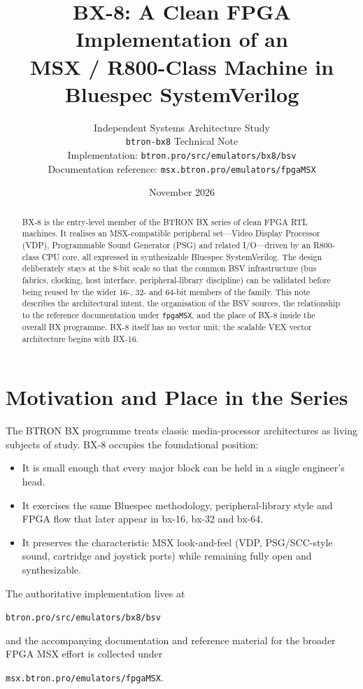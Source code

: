\documentclass[11pt,a4paper]{article}
\title{\textbf{BX-8: A Clean FPGA Implementation of an\\
MSX / R800-Class Machine in Bluespec SystemVerilog}}
\author{
  Independent Systems Architecture Study\\
  \texttt{btron-bx8} Technical Note\\[0.6em]
  \small Implementation: \texttt{btron.pro/src/emulators/bx8/bsv}\\
  \small Documentation reference: \texttt{msx.btron.pro/emulators/fpgaMSX}
}
\date{November 2026}
\begin{document}
\maketitle

\begin{abstract}
BX-8 is the entry-level member of the BTRON BX series of clean FPGA RTL machines. It realises an MSX-compatible peripheral set---Video Display Processor (VDP), Programmable Sound Generator (PSG) and related I/O---driven by an R800-class CPU core, all expressed in synthesizable Bluespec SystemVerilog. The design deliberately stays at the 8-bit scale so that the common BSV infrastructure (bus fabrics, clocking, host interface, peripheral-library discipline) can be validated before being reused by the wider 16-, 32- and 64-bit members of the family. This note describes the architectural intent, the organisation of the BSV sources, the relationship to the reference documentation under \texttt{fpgaMSX}, and the place of BX-8 inside the overall BX programme. BX-8 itself has no vector unit; the scalable VEX vector architecture begins with BX-16.
\end{abstract}

\section{Motivation and Place in the Series}

The BTRON BX programme treats classic media-processor architectures as living subjects of study. BX-8 occupies the foundational position:

\begin{itemize}[leftmargin=1.5em]
  \item It is small enough that every major block can be held in a single engineer's head.
  \item It exercises the same Bluespec methodology, peripheral-library style and FPGA flow that later appear in bx-16, bx-32 and bx-64.
  \item It preserves the characteristic MSX look-and-feel (VDP, PSG/SCC-style sound, cartridge and joystick ports) while remaining fully open and synthesizable.
\end{itemize}

The authoritative implementation lives at
\begin{center}
\texttt{btron.pro/src/emulators/bx8/bsv}
\end{center}
and the accompanying documentation and reference material for the broader FPGA MSX effort is collected under
\begin{center}
\texttt{msx.btron.pro/emulators/fpgaMSX}.
\end{center}
\end{document}
